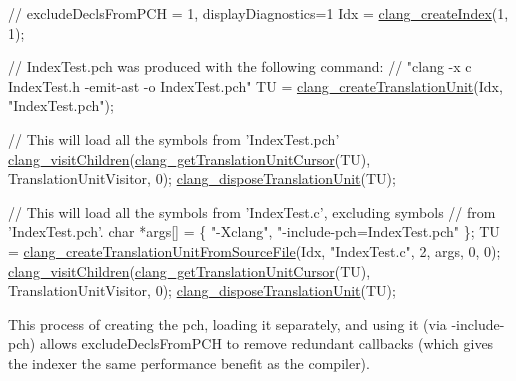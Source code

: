 \begin{DoxyCode}
\textcolor{comment}{// excludeDeclsFromPCH = 1, displayDiagnostics=1}
Idx = \mbox{\hyperlink{group__CINDEX_ga51eb9b38c18743bf2d824c6230e61f93}{clang\_createIndex}}(1, 1);

\textcolor{comment}{// IndexTest.pch was produced with the following command:}
\textcolor{comment}{// "clang -x c IndexTest.h -emit-ast -o IndexTest.pch"}
TU = \mbox{\hyperlink{group__CINDEX__TRANSLATION__UNIT_ga0659baf7f04381286ec54b439760c8f3}{clang\_createTranslationUnit}}(Idx, \textcolor{stringliteral}{"IndexTest.pch"});

\textcolor{comment}{// This will load all the symbols from 'IndexTest.pch'}
\mbox{\hyperlink{group__CINDEX__CURSOR__TRAVERSAL_ga5d0a813d937e1a7dcc35f206ad1f7a91}{clang\_visitChildren}}(\mbox{\hyperlink{group__CINDEX__CURSOR__MANIP_gaec6e69127920785e74e4a517423f4391}{clang\_getTranslationUnitCursor}}(TU),
                    TranslationUnitVisitor, 0);
\mbox{\hyperlink{group__CINDEX__TRANSLATION__UNIT_gaee753cb0036ca4ab59e48e3dff5f530a}{clang\_disposeTranslationUnit}}(TU);

\textcolor{comment}{// This will load all the symbols from 'IndexTest.c', excluding symbols}
\textcolor{comment}{// from 'IndexTest.pch'.}
\textcolor{keywordtype}{char} *args[] = \{ \textcolor{stringliteral}{"-Xclang"}, \textcolor{stringliteral}{"-include-pch=IndexTest.pch"} \};
TU = \mbox{\hyperlink{group__CINDEX__TRANSLATION__UNIT_gaf45dfbcd2e4d8e9eeab4778f994a74c3}{clang\_createTranslationUnitFromSourceFile}}(Idx, \textcolor{stringliteral}{"IndexTest.c"},
       2, args,
                                               0, 0);
\mbox{\hyperlink{group__CINDEX__CURSOR__TRAVERSAL_ga5d0a813d937e1a7dcc35f206ad1f7a91}{clang\_visitChildren}}(\mbox{\hyperlink{group__CINDEX__CURSOR__MANIP_gaec6e69127920785e74e4a517423f4391}{clang\_getTranslationUnitCursor}}(TU),
                    TranslationUnitVisitor, 0);
\mbox{\hyperlink{group__CINDEX__TRANSLATION__UNIT_gaee753cb0036ca4ab59e48e3dff5f530a}{clang\_disposeTranslationUnit}}(TU);
\end{DoxyCode}


This process of creating the \textquotesingle{}pch\textquotesingle{}, loading it separately, and using it (via -\/include-\/pch) allows \textquotesingle{}exclude\+Decls\+From\+P\+CH\textquotesingle{} to remove redundant callbacks (which gives the indexer the same performance benefit as the compiler). \mbox{\label{group__CINDEX_ga21e96379358f2aedc56890f9a35d4125}} 

